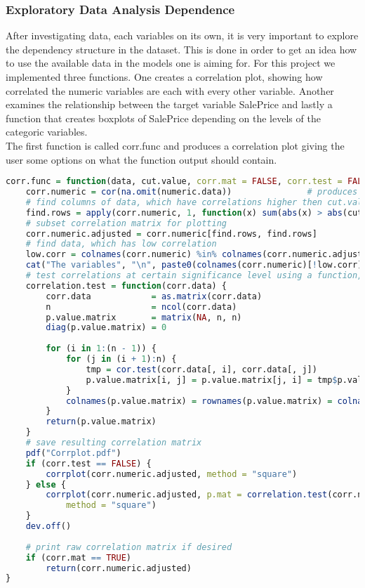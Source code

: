 \subsubsection{Exploratory Data Analysis Dependence}
After investigating data, each variables on its own, it is very important to explore the dependency structure in the dataset. This is done in order to get an idea how to use the available data in the models one is aiming for. For this project we implemented three functions. One creates a correlation plot, showing how correlated the numeric variables are each with every other variable. Another examines the relationship between the target variable SalePrice and lastly a function that creates boxplots of SalePrice depending on the levels of the categoric variables. \\
The first function is called corr.func and produces a correlation  plot giving the user some options on what the function output should contain.
\begin{lstlisting}[language=R]
corr.func = function(data, cut.value, corr.mat = FALSE, corr.test = FALSE, significance = 0.05) {
    corr.numeric = cor(na.omit(numeric.data))               # produces correlation matrix of all numeric variables in the dataset
    # find columns of data, which have correlations higher then cut.value
    find.rows = apply(corr.numeric, 1, function(x) sum(abs(x) > abs(cut.value)) > 1)
    # subset correlation matrix for plotting
    corr.numeric.adjusted = corr.numeric[find.rows, find.rows]
    # find data, which has low correlation
    low.corr = colnames(corr.numeric) %in% colnames(corr.numeric.adjusted)
    cat("The variables", "\n", paste0(colnames(corr.numeric)[!low.corr], collapse = ", "), "\n", "have very low bivariate correlations with the other numeric variables in the training data set!")
    # test correlations at certain significance level using a function, that produces a p-value matrix for all bivariate correlations
    correlation.test = function(corr.data) {
        corr.data            = as.matrix(corr.data)
        n                    = ncol(corr.data)
        p.value.matrix       = matrix(NA, n, n)
        diag(p.value.matrix) = 0
        
        for (i in 1:(n - 1)) {
            for (j in (i + 1):n) {
                tmp = cor.test(corr.data[, i], corr.data[, j])            # testing correlation
                p.value.matrix[i, j] = p.value.matrix[j, i] = tmp$p.value # filling p-value matrix with respective p-values
            }
            colnames(p.value.matrix) = rownames(p.value.matrix) = colnames(corr.numeric.adjusted)
        }
        return(p.value.matrix)
    }
    # save resulting correlation matrix
    pdf("Corrplot.pdf")
    if (corr.test == FALSE) {
        corrplot(corr.numeric.adjusted, method = "square")
    } else {
        corrplot(corr.numeric.adjusted, p.mat = correlation.test(corr.numeric.adjusted), sig.level = significance, 
            method = "square")
    }
    dev.off()
    
    # print raw correlation matrix if desired
    if (corr.mat == TRUE) 
        return(corr.numeric.adjusted)
}
\end{lstlisting}
